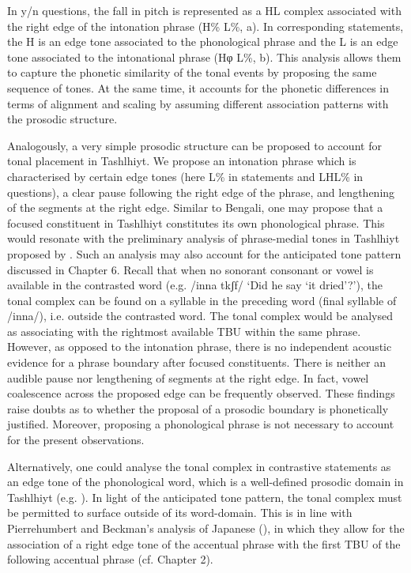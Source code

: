 In y/n questions, the fall in pitch is represented as a HL complex associated with the right edge of the intonation phrase (H\% L\%, a). In corresponding statements, the H is an edge tone associated to the phonological phrase and the L is an edge tone associated to the intonational phrase (Hφ L\%, b). This analysis allows them to capture the phonetic similarity of the tonal events by proposing the same sequence of tones. At the same time, it accounts for the phonetic differences in terms of alignment and scaling by assuming different association patterns with the prosodic structure.

Analogously, a very simple prosodic structure can be proposed to account for tonal placement in Tashlhiyt. We propose an intonation phrase which is characterised by certain edge tones (here L\% in statements and LHL\% in questions), a clear pause following the right edge of the phrase, and lengthening of the segments at the right edge. Similar to Bengali, one may propose that a focused constituent in Tashlhiyt constitutes its own phonological phrase. This would resonate with the preliminary analysis of phrase-medial tones in Tashlhiyt proposed by \citet{Grice.etal2011}. Such an analysis may also account for the anticipated tone pattern discussed in Chapter 6. Recall that when no sonorant consonant or vowel is available in the contrasted word (e.g. /inna tkʃf/ ‘Did he say ‘it dried’?’), the tonal complex can be found on a syllable in the preceding word (final syllable of /inna/), i.e. outside the contrasted word. The tonal complex would be analysed as associating with the rightmost available TBU within the same phrase. However, as opposed to the intonation phrase, there is no independent acoustic evidence for a phrase boundary after focused constituents. There is neither an audible pause nor lengthening of segments at the right edge. In fact, vowel coalescence across the proposed edge can be frequently observed. These findings raise doubts as to whether the proposal of a prosodic boundary is phonetically justified. Moreover, proposing a phonological phrase is not necessary to account for the present observations.  

Alternatively, one could analyse the tonal complex in contrastive statements as an edge tone of the phonological word, which is a well-defined prosodic domain in Tashlhiyt (e.g. \citealt{DE2002}). In light of the anticipated tone pattern, the tonal complex must be permitted to surface outside of its word-domain. This is in line with Pierrehumbert and Beckman’s analysis of Japanese (\citeyear{PierrBeck1988}), in which they allow for the association of a right edge tone of the accentual phrase with the first TBU of the following accentual phrase (cf. Chapter 2).

